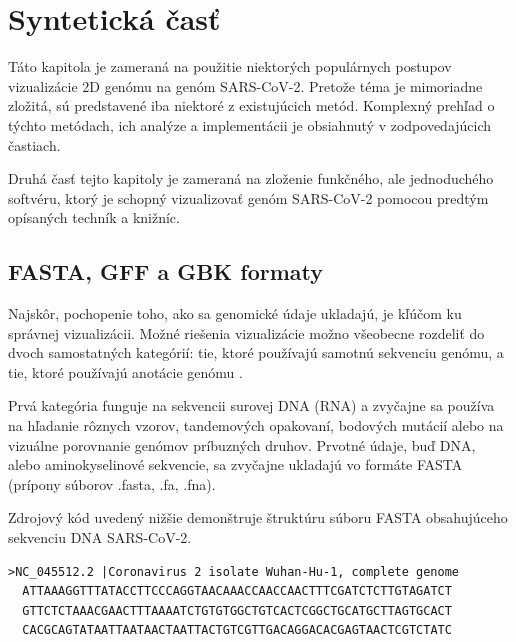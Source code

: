 
\chapter{Syntetická časť}

Táto kapitola je zameraná na použitie niektorých populárnych postupov vizualizácie 2D genómu na genóm SARS-CoV-2.
Pretože téma je mimoriadne zložitá, sú predstavené iba niektoré z existujúcich metód.
Komplexný prehľad o týchto metódach, ich analýze a implementácii je obsiahnutý v zodpovedajúcich častiach.

Druhá časť tejto kapitoly je zameraná na zloženie funkčného, ale jednoduchého softvéru, ktorý je schopný vizualizovať genóm SARS-CoV-2 pomocou predtým opísaných techník a knižníc.

\section{FASTA, GFF a GBK formaty}

Najskôr, pochopenie toho, ako sa genomické údaje ukladajú, je kľúčom ku správnej vizualizácii.
Možné riešenia vizualizácie možno všeobecne rozdeliť do dvoch samostatných kategórií: tie, ktoré používajú samotnú sekvenciu genómu, a tie, ktoré používajú anotácie genómu \cite{covvisual}.

Prvá kategória funguje na sekvencii surovej DNA (RNA) a zvyčajne sa používa na hľadanie rôznych vzorov, tandemových opakovaní, bodových mutácií alebo na vizuálne porovnanie genómov príbuzných druhov.
Prvotné údaje, buď DNA, alebo aminokyselinové sekvencie, sa zvyčajne ukladajú vo formáte FASTA (prípony súborov .fasta, .fa, .fna)\cite{fasta}.

Zdrojový kód uvedený nižšie demonštruje štruktúru súboru FASTA obsahujúceho sekvenciu DNA SARS-CoV-2.

\begin{lstlisting}[caption={Prvých 180 nukleotidov z genómovej sekvencie SARS-CoV-2 vo formáte FASTA. Riadok popisu, ktorý sa začína znakom „>“, obsahuje informácie o postupnosti. Za začiatočným riadkom je samotná aktuálna sekvencia v štandardnom jednopísmenovom reťazci znakov.},captionpos=b]
  >NC_045512.2 |Coronavirus 2 isolate Wuhan-Hu-1, complete genome
  ATTAAAGGTTTATACCTTCCCAGGTAACAAACCAACCAACTTTCGATCTCTTGTAGATCT
  GTTCTCTAAACGAACTTTAAAATCTGTGTGGCTGTCACTCGGCTGCATGCTTAGTGCACT
  CACGCAGTATAATTAATAACTAATTACTGTCGTTGACAGGACACGAGTAACTCGTCTATC
\end{lstlisting}


